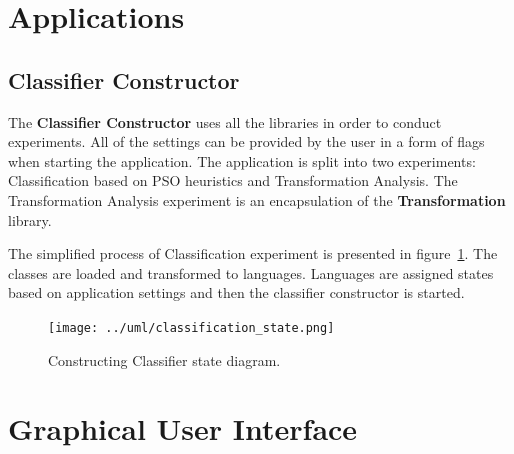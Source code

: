 \documentclass{mini}
\begin{document}
\section{Applications}

\subsection{Classifier Constructor}

The {\bf Classifier Constructor} uses all the libraries in order to conduct experiments. All of the settings can be provided by the user in a form of flags when starting the application. The application is split into two experiments: Classification based on PSO heuristics and Transformation Analysis. The Transformation Analysis experiment is an encapsulation of the {\bf Transformation} library.

The simplified process of Classification experiment is presented in figure~\ref{fig:classification_states}. The classes are loaded and transformed to languages. Languages are assigned states based on application settings and then the classifier constructor is started.

\begin{figure}[H]
    \centering
    \texttt{[image: ../uml/classification\_state.png]}
    \caption{Constructing Classifier state diagram.}
    \label{fig:classification_states}
\end{figure}

\section{Graphical User Interface}
\end{document}
